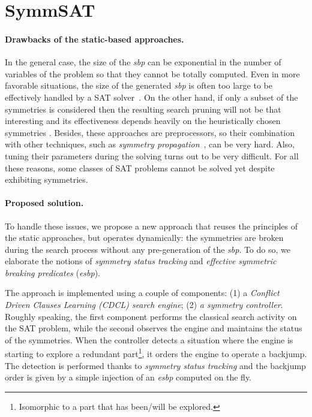 \chapter{SymmSAT}\label{chap:symmSAT}


\subsubsection{Drawbacks of the static-based approaches.} In the general case,
the size of the \textit{sbp} can be exponential in the number of variables of
the problem so that they cannot be totally computed. Even in more favorable
situations, the size of the generated \textit{sbp} is often too large to be
effectively handled by a SAT solver~\cite{Luks2004}. On the other hand, if
only a subset of the symmetries is considered then the resulting search pruning
will not be that interesting and its effectiveness depends heavily on the
heuristically chosen symmetries \cite{biere2009handbook}. Besides, these approaches
are preprocessors, so their combination with other techniques, such as
\emph{symmetry propagation}~\cite{Devriendt12}, can be very hard. Also, tuning
their parameters during the solving turns out to be very difficult. For all
these reasons, some classes of SAT problems cannot be solved yet despite
exhibiting symmetries.



%


\subsubsection{Proposed solution. } To handle these issues, we propose a new
approach that reuses the principles of the static approaches, but operates
dynamically: the symmetries are broken during the search process without any
pre-generation of the \textit{sbp}. To do so, we elaborate the notions of
\emph{symmetry status tracking} and \emph{effective symmetric breaking
	predicates} (\emph{esbp}).

The approach is implemented using a couple of components: (1) a
\textit{Conflict Driven Clauses Learning (CDCL) search engine}; (2) \textit{a
	symmetry controller}. Roughly speaking, the first component performs the
classical search activity on the SAT problem, while the second observes the
engine and maintains the status of the symmetries. When the controller detects
a situation where the engine is starting to explore a redundant
part\footnote{Isomorphic to a part that has been/will be explored.}, it orders
the engine to operate a backjump. The detection is performed thanks to
\emph{symmetry status tracking} and the backjump order is given by a simple
injection of an \emph{esbp} computed on the fly.

